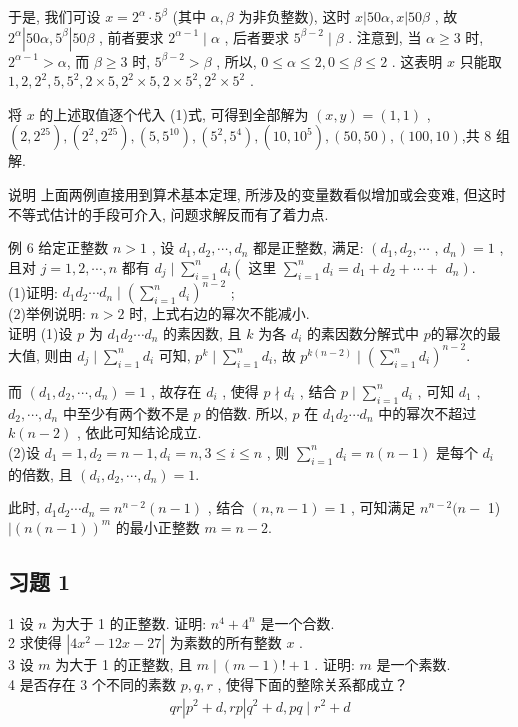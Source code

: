 于是, 我们可设 $x=2^{\alpha} \cdot 5^{\beta}$ (其中 $\alpha ,  \beta$ 为非负整数), 这时 $x|50 \alpha, x| 50 \beta$ , 故 $2^{\alpha}\left|50 \alpha, 5^{\beta}\right| 50 \beta$ , 前者要求 $2^{\alpha-1} \mid \alpha$ , 后者要求 $5^{\beta-2} \mid \beta$ . 注意到, 当 $\alpha \geqslant 3$ 时,  $2^{\alpha-1}>\alpha$, 而 $\beta \geqslant 3$ 时, $5^{\beta-2}>\beta$ , 所以,  $0 \leqslant \alpha \leqslant 2,0 \leqslant \beta \leqslant 2$ . 这表明 $x$ 只能取 $1,2,2^{2}, 5,5^{2}, 2 \times 5,2^{2} \times 5,2 \times 5^{2}, 2^{2} \times 5^{2}$ .

将 $x$ 的上述取值逐个代入 (1)式, 可得到全部解为 $(x, y)=(1,1)$ ,  $\left(2,2^{25}\right),\left(2^{2}, 2^{25}\right),\left(5,5^{10}\right),\left(5^{2}, 5^{4}\right),\left(10,10^{5}\right),(50,50),(100,10)$,共 8 组解.

说明 上面两例直接用到算术基本定理, 所涉及的变量数看似增加或会变难, 但这时不等式估计的手段可介入, 问题求解反而有了着力点.

例 6 给定正整数 $n>1$ , 设 $d_{1}, d_{2}, \cdots, d_{n}$ 都是正整数, 满足:  $\left(d_{1}, d_{2}, \cdots\right.$ ,  $\left.d_{n}\right)=1$ , 且对 $j=1,2, \cdots, n$ 都有 $d_{j} \mid \sum_{i=1}^{n} d_{i}\left(\right.$ 这里 $\sum_{i=1}^{n} d_{i}=d_{1}+d_{2}+\cdots+$ $\left.d_{n}\right)$.\\
(1)证明: $d_{1} d_{2} \cdots d_{n} \mid\left(\sum_{i=1}^{n} d_{i}\right)^{n-2}$ ; \\
(2)举例说明:  $n>2$ 时, 上式右边的幂次不能减小.\\
证明 (1)设 $p$ 为 $d_{1} d_{2} \cdots d_{n}$ 的素因数, 且 $k$ 为各 $d_{i}$ 的素因数分解式中 $p$的幂次的最大值, 则由 $d_{j} \mid \sum_{i=1}^{n} d_{i}$ 可知, $p^{k} \mid \sum_{i=1}^{n} d_{i}$, 故 $p^{k(n-2)} \mid\left(\sum_{i=1}^{n} d_{i}\right)^{n-2}$.

而 $\left(d_{1}, d_{2}, \cdots, d_{n}\right)=1$ , 故存在 $d_{i}$ , 使得 $p \nmid d_{i}$ , 结合 $p \mid \sum_{i=1}^{n} d_{i}$ , 可知 $d_{1}$ ,  $d_{2}, \cdots, d_{n}$ 中至少有两个数不是 $p$ 的倍数. 所以, $p$ 在 $d_{1} d_{2} \cdots d_{n}$ 中的幂次不超过 $k(n-2)$ , 依此可知结论成立. \\
(2)设 $d_{1}=1, d_{2}=n-1, d_{i}=n, 3 \leqslant i \leqslant n$ , 则 $\sum_{i=1}^{n} d_{i}=n(n-1)$ 是每个 $d_{i}$ 的倍数, 且 $\left(d_{i}, d_{2}, \cdots, d_{n}\right)=1$.

此时,  $d_{1} d_{2} \cdots d_{n}=n^{n-2}(n-1)$ , 结合 $(n, n-1)=1$ , 可知满足 $n^{n-2}(n-$ 1) $\mid(n(n-1))^{m}$ 的最小正整数 $m=n-2$.

\subsection{习题 1}
1 设 $n$ 为大于 1 的正整数. 证明:  $n^{4}+4^{n}$ 是一个合数. \\
2 求使得 $\left|4 x^{2}-12 x-27\right|$ 为素数的所有整数 $x$ . \\
3 设 $m$ 为大于 1 的正整数, 且 $m \mid(m-1)!+1$ . 证明:  $m$ 是一个素数. \\
4 是否存在 3 个不同的素数 $p ,  q ,  r$ , 使得下面的整除关系都成立？
\begin{align*}
	q r\left|p^{2}+d, r p\right| q^{2}+d, p q \mid r^{2}+d
\end{align*}

